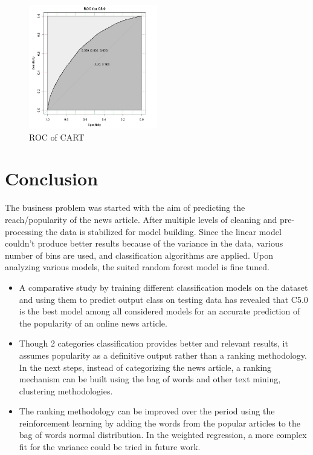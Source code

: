 \documentclass[sigchi]{acmart}
\begin{document}
\begin{figure}[h!]
    \caption{ROC of CART}
    \centering
    \includegraphics[width=0.50\textwidth]{ROCofC5.0JPG.JPG}
\end{figure}

\section{Conclusion}
The business problem was started with the aim of predicting the reach/popularity of the news article. After multiple levels of cleaning and pre-processing the data is stabilized for model building. Since the linear model couldn’t produce better results because of the variance in the data, various number of bins are used, and classification algorithms are applied. Upon analyzing various models, the suited random forest model is fine tuned.
\begin{itemize}
    \item A comparative study by training different classification models on the dataset and using them to predict output class on testing data has revealed that C5.0 is the best model among all considered models for an accurate prediction of the popularity of an online news article.
    \item Though 2 categories classification provides better and relevant results, it assumes popularity as a definitive output rather than a ranking methodology. In the next steps, instead of categorizing the news article, a ranking mechanism can be built using the bag of words and other text mining, clustering methodologies\cite{Popularity}. 
    \item The ranking methodology can be improved over the period using the reinforcement learning by adding the words from the popular articles to the bag of words normal distribution. In the weighted regression, a more complex fit for the variance could be tried in future work.
\end{itemize}




\end{document}
